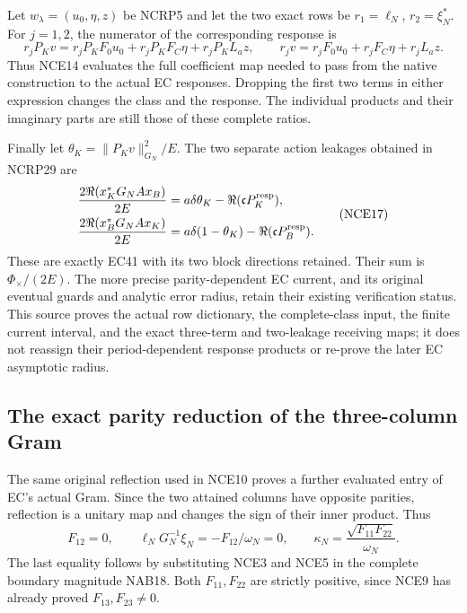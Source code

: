 \documentclass[11pt,a4paper]{article}
\begin{document}
Let $w_\lambda=(u_0,\eta,z)$ be NCRP5 and let the two exact rows be
$r_1=\ell_N$, $r_2=\xi_N^*$.
For $j=1,2$, the numerator of the corresponding response is
\[
 r_jP_Kv
    =r_jP_KF_0u_0+r_jP_KF_C\eta+r_jP_KL_az,
 \qquad
 r_jv=r_jF_0u_0+r_jF_C\eta+r_jL_az .
 \tag{NCE16}
\]
Thus NCE14 evaluates the full coefficient map needed to pass from
the native construction to the actual EC responses. Dropping the
first two terms in either expression changes the class and the
response. The individual products and their imaginary parts are
still those of these complete ratios.

Finally let $\theta_K=\|P_Kv\|_{G_N}^2/E$. The two separate action
leakages obtained in NCRP29 are
\[
 \begin{split}
 \frac{2\Re(x_K^*G_NAx_B)}{2E}
       &=a\delta\theta_K-\Re(\mathfrak c P_K^{\rm resp}),\\
 \frac{2\Re(x_B^*G_NAx_K)}{2E}
       &=a\delta(1-\theta_K)-\Re(\mathfrak c P_B^{\rm resp}).
 \end{split}                                                     \tag{NCE17}
\]
These are exactly EC41 with its two block directions retained.
Their sum is $\Phi_\times/(2E)$.
The more precise parity-dependent EC current, and its original
eventual guards and analytic error radius, retain their existing
verification status. This source proves the actual row dictionary,
the complete-class input, the finite current interval, and the
exact three-term and two-leakage receiving maps; it does not
reassign their period-dependent response products or re-prove
the later EC asymptotic radius.

\subsection{The exact parity reduction of the three-column Gram}

The same original reflection used in NCE10 proves a further evaluated
entry of EC's actual Gram. Since the two attained columns have opposite
parities, reflection is a unitary map and changes the sign of their
inner product. Thus
\[
 F_{12}=0,\qquad
 \ell_NG_N^{-1}\xi_N=-F_{12}/\omega_N=0,\qquad
 \kappa_N=\frac{\sqrt{F_{11}F_{22}}}{\omega_N}.
 \tag{NCE18}
\]
The last equality follows by substituting NCE3 and NCE5 in the complete
boundary magnitude NAB18. Both $F_{11},F_{22}$ are strictly positive,
since NCE9 has already proved $F_{13},F_{23}\ne0$.
\end{document}
